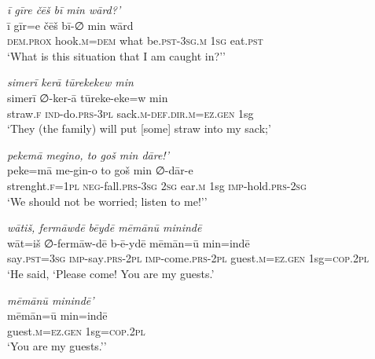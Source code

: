 \ea \label{HB.23}
\textit{ī gīre čēš bī min wārd?’} \\ 
\gll ī gīr=e čēš bī-∅ min wārd \\ 
 \textsc{dem.prox} hook\textsc{.m}\textsc{=dem} what be\textsc{.pst}\textsc{-3sg}\textsc{.m} \textsc{1sg} eat\textsc{.pst} \\ 
\glt `What is this situation that I am caught in?’'
\z 
 
\ea \label{HB.36}
\textit{simerī kerā tūrekekew min} \\ 
\gll simerī ∅-ker-ā tūreke-eke=w min \\ 
 straw\textsc{\textsc{.f}} \textsc{ind-}do\textsc{.prs}\textsc{-3pl} sack\textsc{.m}\textsc{-def}\textsc{.dir}\textsc{.m}\textsc{=ez}\textsc{.gen} 1sg \\ 
\glt `They (the family) will put [some] straw into my sack;'
\z 
 
\ea \label{HB.43}
\textit{pekemā megino, to goš min dāre!’} \\ 
\gll peke=mā me-gin-o to goš min ∅-dār-e \\ 
 strenght\textsc{\textsc{.f}}\textsc{=1pl} \textsc{neg-}fall\textsc{.prs}\textsc{-3sg} \textsc{2sg} ear\textsc{.m} 1sg \textsc{imp-}hold\textsc{.prs}-\textsc{2sg} \\ 
\glt `We should not be worried; listen to me!’'
\z 
 
\ea \label{HB.51}
\textit{wātiš, fermāwdē bēydē mēmānū minindē} \\ 
\gll wāt=iš ∅-fermāw-dē b-ē-ydē mēmān=ū min=indē \\ 
 say\textsc{.pst}\textsc{=3sg} \textsc{imp-}say\textsc{.prs}\textsc{-2pl} \textsc{imp-}come\textsc{.prs}\textsc{-2pl} guest\textsc{.m}\textsc{=ez}\textsc{.gen} 1sg\textsc{=cop}\textsc{.2pl} \\ 
\glt `He said, ‘Please come! You are my guests.'
\z 
 
\ea \label{HB.52}
\textit{mēmānū minindē'} \\ 
\gll mēmān=ū min=indē \\ 
 guest\textsc{.m}\textsc{=ez}\textsc{.gen} 1sg\textsc{=cop}\textsc{.2pl} \\ 
\glt `You are my guests.’'
\z 
 
